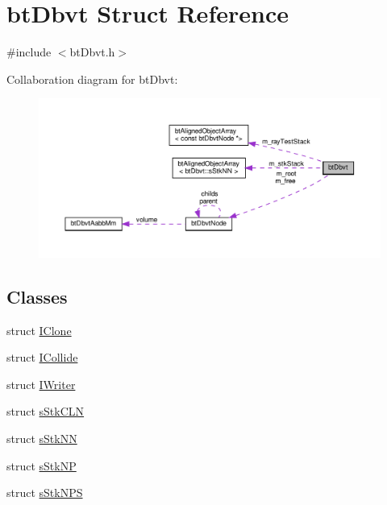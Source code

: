 \hypertarget{structbtDbvt}{}\section{bt\+Dbvt Struct Reference}
\label{structbtDbvt}


{\ttfamily \#include $<$bt\+Dbvt.\+h$>$}



Collaboration diagram for bt\+Dbvt\+:
\nopagebreak
\begin{figure}[H]
\begin{center}
\leavevmode
\includegraphics[width=350pt]{structbtDbvt__coll__graph}
\end{center}
\end{figure}
\subsection*{Classes}
\begin{DoxyCompactItemize}
\item 
struct \hyperlink{structbtDbvt_1_1IClone}{I\+Clone}
\item 
struct \hyperlink{structbtDbvt_1_1ICollide}{I\+Collide}
\item 
struct \hyperlink{structbtDbvt_1_1IWriter}{I\+Writer}
\item 
struct \hyperlink{structbtDbvt_1_1sStkCLN}{s\+Stk\+C\+LN}
\item 
struct \hyperlink{structbtDbvt_1_1sStkNN}{s\+Stk\+NN}
\item 
struct \hyperlink{structbtDbvt_1_1sStkNP}{s\+Stk\+NP}
\item 
struct \hyperlink{structbtDbvt_1_1sStkNPS}{s\+Stk\+N\+PS}
\end{DoxyCompactItemize}
